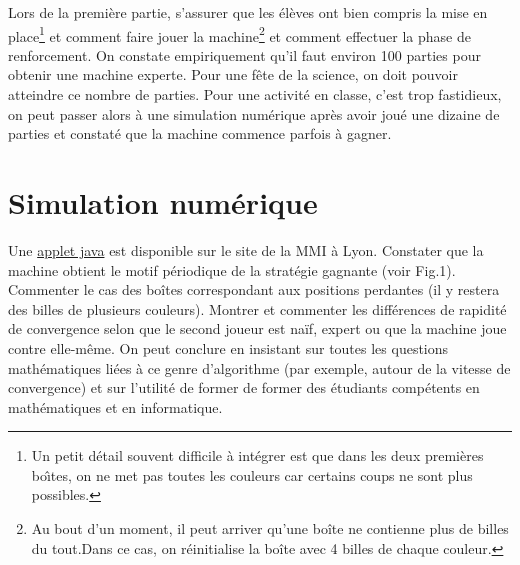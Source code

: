 \documentclass[a4paper,12pt]{article}
\begin{document}
\noindent Lors de la première partie, s'assurer que les élèves ont bien compris la mise en place\footnote{Un petit détail souvent difficile à intégrer est que dans les deux premières bo\^\i tes, on ne met pas toutes les couleurs car certains coups ne sont plus possibles.} et comment faire jouer la machine\footnote{Au bout d'un moment, il peut arriver qu'une boîte ne contienne plus de billes du tout.Dans ce cas, on réinitialise la boîte avec 4 billes de chaque couleur.} et comment effectuer la phase de renforcement.
%
On constate empiriquement qu'il faut environ 100 parties pour obtenir une machine experte. Pour une fête de la science, on doit pouvoir atteindre ce nombre de parties. Pour une activité en classe, c'est trop fastidieux, on peut passer alors à une simulation numérique après avoir joué une dizaine de parties et constaté que la machine commence parfois à gagner.

\section{Simulation numérique} \label{simulation-numuxe9rique}
\noindent Une \href{https://u.pcloud.link/publink/show?code=XZsn7zVZrWj4xUeBzmhLp8Pxd7ismY5ezrMX}{applet
java} est disponible sur le site de la MMI\cite{MMI} à Lyon. Constater que la machine obtient le motif périodique de la stratégie gagnante (voir Fig.1). Commenter le cas des boîtes correspondant aux positions perdantes (il y restera des billes de plusieurs couleurs). Montrer et commenter les différences de rapidité de convergence selon que le second joueur est naïf, expert ou que la machine joue contre elle-même.
%
On peut conclure en insistant sur toutes les questions mathématiques liées à ce genre d'algorithme (par exemple, autour de la vitesse de convergence) et sur l'utilité de former de former des étudiants compétents en mathématiques et en informatique.
\end{document}

